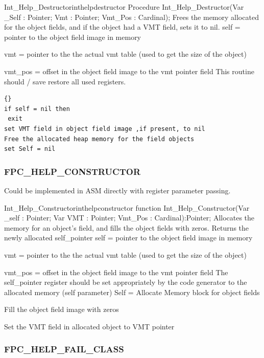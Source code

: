 \documentclass [a4paper,12pt]{article}
\begin{document}
\begin{procedurel}{Int{\_}Help{\_}Destructor}{inthelpdestructor}
\Declaration
Procedure Int{\_}Help{\_}Destructor(Var {\_}Self : Pointer; Vmt : Pointer; Vmt{\_}Pos : Cardinal);
\Description
Frees the memory allocated for the object fields, and if the object had a
VMT field, sets it to nil.
\Parameters
self = pointer to the object field image in memory \par
vmt = pointer to the the actual vmt table (used to get the size of the object) \par
vmt{\_}pos = offset in the object field image to the vmt pointer field
\Notes
This routine should / save restore all used registers.
\Algorithm
\begin{lstlisting}{}
if self = nil then
 exit
set VMT field in object field image ,if present, to nil
Free the allocated heap memory for the field objects
set Self = nil
\end{lstlisting}
\end{procedurel}

\subsubsection{FPC{\_}HELP{\_}CONSTRUCTOR}
\label{subsubsec:mylabel83}

Could be implemented in ASM directly with register parameter passing.

\begin{functionl}{Int{\_}Help{\_}Constructor}{inthelpconstructor}
\Declaration
function Int{\_}Help{\_}Constructor(Var {\_}self : Pointer; Var VMT : Pointer; Vmt{\_}Pos : Cardinal):Pointer;
\Description
Allocates the memory for an object's field, and fills the object fields with
zeros. Returns the newly allocated self{\_}pointer
\Parameters
self = pointer to the object field image in memory \par
vmt = pointer to the the actual vmt table (used to get the size of the object) \par
vmt{\_}pos = offset in the object field image to the vmt pointer field
\Notes
The self{\_}pointer register should be set appropriately by the code
generator to the allocated memory (self parameter)
\Algorithm
Self = Allocate Memory block for object fields \par
Fill the object field image with zeros\par
Set the VMT field in allocated object to VMT pointer
\end{functionl}

\subsubsection{FPC{\_}HELP{\_}FAIL{\_}CLASS}
\label{subsubsec:mylabel84}
\end{document}
